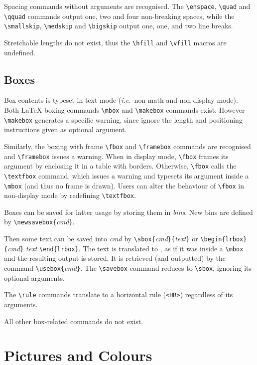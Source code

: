 Spacing commands without arguments are recognised.
The \verb+\enspace+, \verb+\quad+ and \verb+\qquad+ commands output
one, two and four non-breaking spaces, while the \verb+\smallskip+,
\verb+\medskip+ and \verb+\bigskip+ output one, one, and two line
breaks.

Stretchable lengths do not exist, thus the \verb+\hfill+ and
\verb+\vfill+ macros are undefined.

\subsection{Boxes}

Box contents is typeset in text mode (\emph{i.e.}\ non-math and non-display
mode).
Both \LaTeX{} boxing commands \verb+\mbox+ and \verb+\makebox+
commands exist.
However  \verb+\makebox+ generates a specific warning, since \hevea{}
ignore the length and positioning instructions given as optional
argument.

Similarly, the boxing with frame \verb+\fbox+ and \verb+\framebox+
commands are recognised and
\verb+\framebox+ issues a warning.
When in display mode, \verb+\fbox+ frames its argument by
enclosing it in a
table with borders. Otherwise, \verb+\fbox+ calls the \verb+\textfbox+
command, which issues a warning and typesets its argument
inside a \verb+\mbox+ (and thus no frame is drawn).
Users can alter the behaviour of \verb+\fbox+ in non-display mode by
redefining \verb+\textfbox+.



Boxes can be saved for latter usage by storing them in {\em bins}.
New bins are defined by \verb+\newsavebox{+{\it cmd}\verb+}+.

Then some text can be saved into {\it cmd} by
\verb+\sbox{+{\it cmd}\verb+}{+{\it text}\verb+}+ or
\verb+\begin{lrbox}{+\textit{cmd}\verb+}+ \textit{text} \verb+\end{lrbox}+.
The text is translated to \html{}, as if it was inside a \verb+\mbox+
and the resulting output is stored.
It is retrieved (and outputted) by the command
\verb+\usebox{+{\it cmd}\verb+}+.
The \verb+\savebox+ command reduces to \verb+\sbox+, ignoring its
optional arguments.

The \verb+\rule+ commands translate to a \html{} horizontal rule
(\verb+<HR>+)  regardless of its arguments.


All other box-related commands do not exist.

\section{Pictures and Colours}

